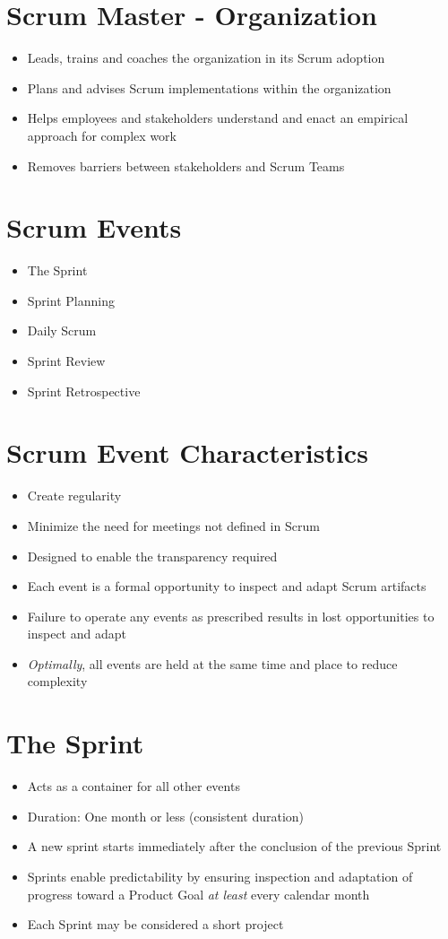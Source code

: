 \documentclass[a4paper,11pt,twocolumn]{article}
\begin{document}
\section*{Scrum Master - Organization}
\begin{itemize}
	\item Leads, trains and coaches the organization in its Scrum adoption
	\item Plans and advises Scrum implementations within the organization
	\item Helps employees and stakeholders understand and enact an empirical approach for complex work
	\item Removes barriers between stakeholders and Scrum Teams
\end{itemize}

\section*{Scrum Events}
\begin{itemize}
	\item The Sprint
	\item Sprint Planning
	\item Daily Scrum
	\item Sprint Review
	\item Sprint Retrospective
\end{itemize}

\section*{Scrum Event Characteristics}
\begin{itemize}
	\item Create regularity
	\item Minimize the need for meetings not defined in Scrum
	\item Designed to enable the transparency required
	\item Each event is a formal opportunity to inspect and adapt Scrum artifacts
	\item Failure to operate any events as prescribed results in lost opportunities to inspect and adapt
	\item \textit{Optimally}, all events are held at the same time and place to reduce complexity
\end{itemize}

\section*{The Sprint}
\begin{itemize}
	\item Acts as a container for all other events
	\item Duration: One month or less (consistent duration)
	\item A new sprint starts immediately after the conclusion of the previous Sprint
	\item Sprints enable predictability by ensuring inspection and adaptation of progress toward a Product Goal \textit{at least} every calendar month
	\item Each Sprint may be considered a short project
\end{itemize}
\end{document}
